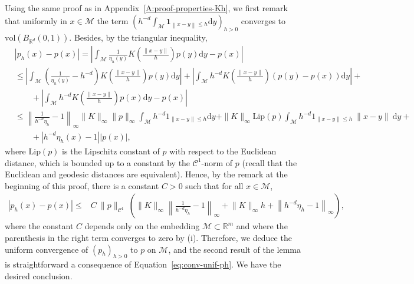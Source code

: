 \documentclass[10pt,a4paper]{article}
\newcommand{\ind}{{\mathbf 1}}
\newcommand{\vol}{ \mathrm{vol}}
\newcommand\cC{\mathcal{C}}
\newcommand\cM{\mathcal{M}}
\newcommand\dR{\mathbb{R}}
\newcommand\dd{\mathrm{d}}
\newcommand{\ABS}[1]{{{\left| #1 \right|}}} %
\newcommand{\NRM}[1]{{{\left\| #1\right\|}}} %
\newcommand{\PAR}[1]{{{\left(#1\right)}}} %
\begin{document}
Using the same proof as in Appendix~\ref{A:proof-properties-Kh}, we first remark that uniformly in $x\in\cM$ the term $\PAR{h^{-d}\int_\cM\ind_{\NRM{x-y}\le h}\dd y}_{h>0}$ converges to $\vol\PAR{B_{\dR^d}(0,1)}$.
    Besides, by the triangular inequality,
    \begin{align*}
        & \ABS{p_h(x)-p(x)} = \ABS{ \int_{\cM} \frac{1}{\eta_h(y)} K\PAR{\frac{\|x-y \|}{h}}p(y)\dd y -p(x)}
        \\
             &  \le \ABS{ \int_{\cM} \PAR{\frac{1}{\eta_h(y)} -h^{-d}} K\PAR{\frac{\|x-y \|}{h}}p(y)\dd y } +\ABS{ \int_{\cM} h^{-d} K\PAR{\frac{\|x-y \|}{h}}(p(y)-p(x))\dd y } +
        \\
        & \qquad + \ABS{ \int_{\cM} h^{-d} K\PAR{\frac{\|x-y \|}{h}}p(x)\dd y -p(x)}
        \\
        &\le       \NRM{\frac{1}{h^{-d}\eta_h}-1}_\infty \| K\|_{\infty}\|p\|_{\infty}\int_\cM  h^{-d} 1_{\| x-y\| \le h}  \dd y  +\| K\|_{\infty}\mathrm{Lip}(p)\int_\cM h^{-d}  1_{\| x-y\| \le h}  \ \| x-y\| \ \dd y + 
        \\
        & \qquad +|h^{-d} \eta_h(x)-1| | p(x)|,
    \end{align*}
    where $\mathrm{Lip}(p)$ is the Lipschitz constant of $p$ with respect to the Euclidean distance, which is bounded up to a constant by the $\cC^1$-norm of $p$ (recall that the Euclidean and geodesic distances are equivalent). Hence, by the remark at the beginning of this proof, there is a constant $C>0$ such that for all $x\in \cM$,
    \begin{align}\label{eq:conv-unif-ph}
         \ABS{p_h(x)-p(x)} \le  &  C  \  \|p\|_{\cC^1}\ \PAR{ {\|K\|_\infty}\NRM{\frac{1}{h^{-d}\eta_h}-1}_\infty+{\|K\|_\infty}h+\NRM{h^{-d}\eta_h-1}_\infty},
    \end{align}
    where the constant $C$ depends only on the embedding $\cM \subset \mathbb{R}^m$ and where the parenthesis in the right term  converges to zero by (i). Therefore, we deduce the uniform convergence of $(p_h)_{h>0}$ to $p$ on $\cM$, and the second result of the lemma is straightforward a consequence of Equation~\eqref{eq:conv-unif-ph}. We have the desired conclusion.
\end{document}
